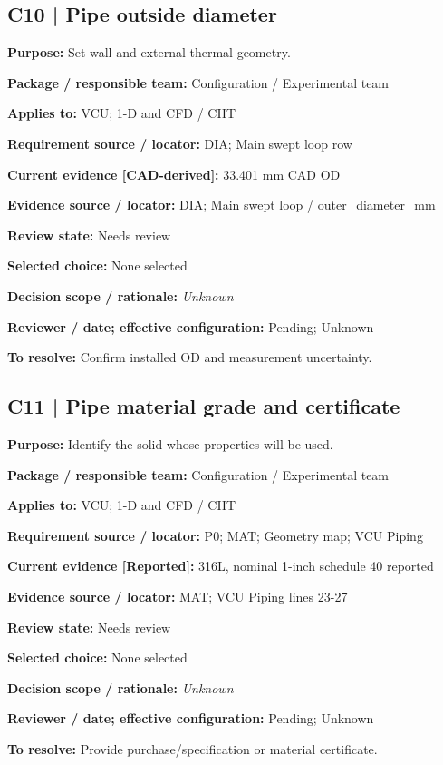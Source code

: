 \documentclass[11pt]{article}
\begin{document}
\par\noindent\begin{minipage}{\textwidth}\small\setlength{\parskip}{2pt}
\subsection*{C10 | Pipe outside diameter}
\textbf{Purpose:} Set wall and external thermal geometry.\par
\textbf{Package / responsible team:} Configuration / Experimental team\par
\textbf{Applies to:} VCU; 1-D and CFD / CHT\par
\textbf{Requirement source / locator:} DIA; Main swept loop row\par
\textbf{Current evidence [CAD-derived]:} 33.401 mm CAD OD\par
\textbf{Evidence source / locator:} DIA; Main swept loop / outer\_\allowbreak{}diameter\_\allowbreak{}mm\par
\textbf{Review state:} Needs review\par
\textbf{Selected choice:} None selected\par
\textbf{Decision scope / rationale:} \textit{Unknown}\par
\textbf{Reviewer / date; effective configuration:} Pending; Unknown\par
\textbf{To resolve:} Confirm installed OD and measurement uncertainty.\par
\end{minipage}\par\vspace{5pt}
\par\noindent\begin{minipage}{\textwidth}\small\setlength{\parskip}{2pt}
\subsection*{C11 | Pipe material grade and certificate}
\textbf{Purpose:} Identify the solid whose properties will be used.\par
\textbf{Package / responsible team:} Configuration / Experimental team\par
\textbf{Applies to:} VCU; 1-D and CFD / CHT\par
\textbf{Requirement source / locator:} P0; MAT; Geometry map; VCU Piping\par
\textbf{Current evidence [Reported]:} 316L, nominal 1-inch schedule 40 reported\par
\textbf{Evidence source / locator:} MAT; VCU Piping lines 23-27\par
\textbf{Review state:} Needs review\par
\textbf{Selected choice:} None selected\par
\textbf{Decision scope / rationale:} \textit{Unknown}\par
\textbf{Reviewer / date; effective configuration:} Pending; Unknown\par
\textbf{To resolve:} Provide purchase/specification or material certificate.\par
\end{minipage}\par\vspace{5pt}
\end{document}
